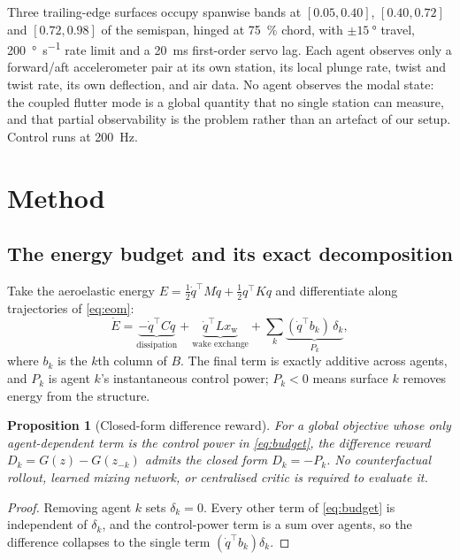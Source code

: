\documentclass[11pt,a4paper]{article}
\newtheorem{proposition}{Proposition}
\begin{document}
Three trailing-edge surfaces occupy spanwise bands at $[0.05,0.40]$,
$[0.40,0.72]$ and $[0.72,0.98]$ of the semispan, hinged at \SI{75}{\percent}
chord, with $\pm\SI{15}{\degree}$ travel, \SI{200}{\degree\per\second} rate limit
and a \SI{20}{\milli\second} first-order servo lag. Each agent observes only a
forward/aft accelerometer pair at its own station, its local plunge rate, twist
and twist rate, its own deflection, and air data. No agent observes the modal
state: the coupled flutter mode is a global quantity that no single station can
measure, and that partial observability is the problem rather than an artefact of
our setup. Control runs at \SI{200}{\hertz}.

\section{Method}

\subsection{The energy budget and its exact decomposition}

Take the aeroelastic energy $E = \tfrac12 \dot q^{\top} M \dot q + \tfrac12
q^{\top} K q$ and differentiate along trajectories of \eqref{eq:eom}:
\begin{equation}
\dot E
= \underbrace{-\dot q^{\top} C \dot q}_{\text{dissipation}}
+ \underbrace{\dot q^{\top} L x_{\mathrm{w}}}_{\text{wake exchange}}
+ \sum_{k} \underbrace{(\dot q^{\top} b_k)\, \delta_k}_{P_k},
\label{eq:budget}
\end{equation}
where $b_k$ is the $k$th column of $B$. The final term is exactly additive across
agents, and $P_k$ is agent $k$'s instantaneous control power; $P_k < 0$ means
surface $k$ removes energy from the structure.

\begin{proposition}[Closed-form difference reward]
\label{prop:diff}
For a global objective whose only agent-dependent term is the control power in
\eqref{eq:budget}, the difference reward $D_k = G(z) - G(z_{-k})$ admits the
closed form $D_k = -P_k$. No counterfactual rollout, learned mixing network, or
centralised critic is required to evaluate it.
\end{proposition}

\begin{proof}
Removing agent $k$ sets $\delta_k = 0$. Every other term of \eqref{eq:budget} is
independent of $\delta_k$, and the control-power term is a sum over agents, so the
difference collapses to the single term $(\dot q^{\top} b_k)\delta_k$.
\end{proof}
\end{document}
